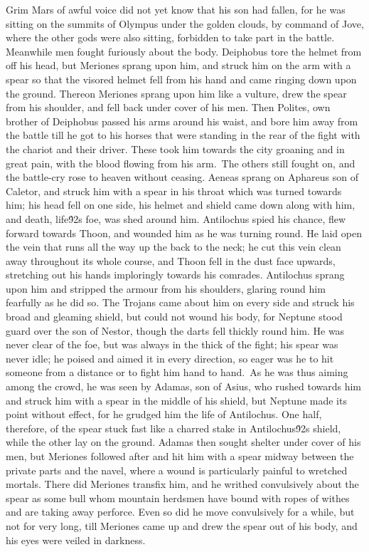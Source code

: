 {Grim Mars of awful voice did not yet know that his son had fallen, for he was sitting on the summits of Olympus under the golden clouds, by command of Jove, where the other gods were also sitting, forbidden to take part in the battle. Meanwhile men fought furiously about the body. Deiphobus tore the helmet from off his head, but Meriones sprang upon him, and struck him on the arm with a spear so that the visored helmet fell from his hand and came ringing down upon the ground. Thereon Meriones sprang upon him like a vulture, drew the spear from his shoulder, and fell back under cover of his men. Then Polites, own brother of Deiphobus passed his arms around his waist, and bore him away from the battle till he got to his horses that were standing in the rear of the fight with the chariot and their driver. These took him towards the city groaning and in great pain, with the blood flowing from his arm.\
The others still fought on, and the battle-cry rose to heaven without ceasing. Aeneas sprang on Aphareus son of Caletor, and struck him with a spear in his throat which was turned towards him; his head fell on one side, his helmet and shield came down along with him, and death, life\'92s foe, was shed around him. Antilochus spied his chance, flew forward towards Thoon, and wounded him as he was turning round. He laid open the vein that runs all the way up the back to the neck; he cut this vein clean away throughout its whole course, and Thoon fell in the dust face upwards, stretching out his hands imploringly towards his comrades. Antilochus sprang upon him and stripped the armour from his shoulders, glaring round him fearfully as he did so. The Trojans came about him on every side and struck his broad and gleaming shield, but could not wound his body, for Neptune stood guard over the son of Nestor, though the darts fell thickly round him. He was never clear of the foe, but was always in the thick of the fight; his spear was never idle; he poised and aimed it in every direction, so eager was he to hit someone from a distance or to fight him hand to hand.\
As he was thus aiming among the crowd, he was seen by Adamas, son of Asius, who rushed towards him and struck him with a spear in the middle of his shield, but Neptune made its point without effect, for he grudged him the life of Antilochus. One half, therefore, of the spear stuck fast like a charred stake in Antilochus\'92s shield, while the other lay on the ground. Adamas then sought shelter under cover of his men, but Meriones followed after and hit him with a spear midway between the private parts and the navel, where a wound is particularly painful to wretched mortals. There did Meriones transfix him, and he writhed convulsively about the spear as some bull whom mountain herdsmen have bound with ropes of withes and are taking away perforce. Even so did he move convulsively for a while, but not for very long, till Meriones came up and drew the spear out of his body, and his eyes were veiled in darkness.\
}
